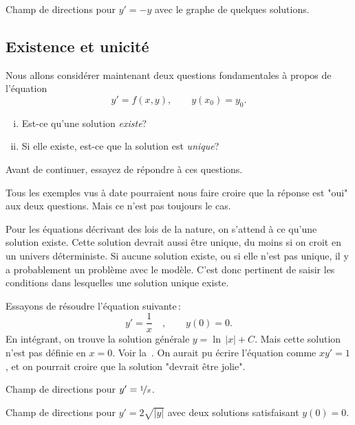 \begin{myfig}
\capstart
{}
\caption{Champ de directions pour $y' = -y$ avec le graphe de quelques solutions.\label{1.3:fig3}}
\end{myfig}

\subsection{Existence et unicité}

Nous allons considérer maintenant deux questions fondamentales à propos de l'équation
\begin{equation*}
y' = f(x,y), \qquad y(x_0) = y_0.
\end{equation*}
\begin{enumerate}[(i)]
\item Est-ce qu'une solution \emph{existe}?
\item Si elle existe, est-ce que la solution est \emph{unique}?
\end{enumerate}
Avant de continuer, essayez de répondre à ces questions.  

Tous les exemples vus à date pourraient nous faire croire que la réponse est "oui" aux deux questions.  Mais ce n'est pas toujours le cas.

Pour les équations décrivant des lois de la nature, on s'attend à ce qu'une solution existe.  Cette solution devrait aussi être unique, du moins si on croit en un univers déterministe.  Si aucune solution existe, ou si elle n'est pas unique, il y a probablement un problème avec le modèle.  C'est donc pertinent de saisir les conditions dans lesquelles une solution unique existe.


\begin{example}
Essayons de résoudre l'équation suivante\,: 
\begin{equation*}
y' = \frac{1}{x} \quad ,\qquad  y(0) = 0 .
\end{equation*}
En intégrant, on trouve la solution générale $y = \ln \, \lvert x \rvert + C$.  Mais cette solution n'est pas définie en $x=0$.  Voir la~.  On aurait pu écrire l'équation comme $x y' = 1$, et on pourrait croire que la solution "devrait être jolie".

\begin{myfig}
\parbox[t]{3in}{
 \capstart
 \caption{Champ de directions pour $y' = \nicefrac{1}{x}$.\label{1.3:xinvfig}}
}
\quad
\parbox[t]{3in}{
 \capstart
 \caption{Champ de directions pour $y' = 2 \sqrt{\lvert y \rvert}$ avec deux solutions satisfaisant $y(0) = 0$.\label{1.3:sqrtfig}}
}
\end{myfig}
\end{example}

